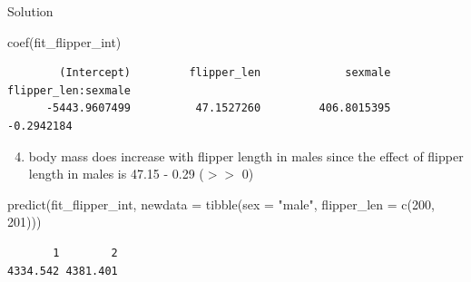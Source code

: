 \documentclass[
  10pt,
  ignorenonframetext,
  aspectratio=169,
  t]{beamer}
\newenvironment{Shaded}{\begin{snugshade}}{\end{snugshade}}
\newcommand{\AttributeTok}[1]{\textcolor[rgb]{0.40,0.45,0.13}{#1}}
\newcommand{\DecValTok}[1]{\textcolor[rgb]{0.68,0.00,0.00}{#1}}
\newcommand{\FunctionTok}[1]{\textcolor[rgb]{0.28,0.35,0.67}{#1}}
\newcommand{\NormalTok}[1]{\textcolor[rgb]{0.00,0.23,0.31}{#1}}
\newcommand{\StringTok}[1]{\textcolor[rgb]{0.13,0.47,0.30}{#1}}
\providecommand{\tightlist}{%
  \setlength{\itemsep}{0pt}\setlength{\parskip}{0pt}}
\begin{document}
\begin{frame}[fragile]{Solution}
\protect{}\label{solution-6}
\footnotesize

\begin{Shaded}
\begin{Highlighting}[]
\FunctionTok{coef}\NormalTok{(fit\_flipper\_int)}
\end{Highlighting}
\end{Shaded}

\begin{verbatim}
        (Intercept)         flipper_len             sexmale flipper_len:sexmale 
      -5443.9607499          47.1527260         406.8015395          -0.2942184 
\end{verbatim}

\normalsize

\small

\begin{enumerate}
\setcounter{enumi}{3}
\tightlist
\item
  body mass does increase with flipper length in males since the effect
  of flipper length in males is 47.15 - 0.29 (\(>>\) 0)
\end{enumerate}

\footnotesize

\begin{Shaded}
\begin{Highlighting}[]
\FunctionTok{predict}\NormalTok{(fit\_flipper\_int, }\AttributeTok{newdata =} \FunctionTok{tibble}\NormalTok{(}\AttributeTok{sex =} \StringTok{"male"}\NormalTok{, }\AttributeTok{flipper\_len =} \FunctionTok{c}\NormalTok{(}\DecValTok{200}\NormalTok{, }\DecValTok{201}\NormalTok{)))}
\end{Highlighting}
\end{Shaded}

\begin{verbatim}
       1        2 
4334.542 4381.401 
\end{verbatim}

\normalsize
\end{frame}
\end{document}
